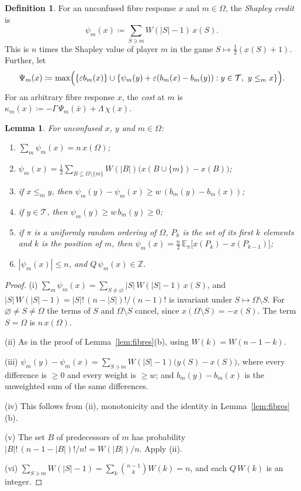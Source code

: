 \documentclass[11pt]{article}
\newcommand{\chg}[1]{{\color{red}#1}}
\newtheorem{lemma}[theorem]{Lemma}
\theoremstyle{definition}
\newtheorem{definition}[theorem]{Definition}
\theoremstyle{remark}
\newcommand{\T}{\mathcal T}
\begin{document}
\begin{definition}\label{def:cost}
For an unconfused fibre response $x$ and $m\in\Omega$, the \emph{Shapley credit} is
\[
\psi_m(x)\coloneqq\sum_{S\ni m}W(|S|-1)\,x(S).
\]
\chg{This is $n$ times the Shapley value \cite{Shapley1953} of player $m$ in the game $S\mapsto\tfrac12(x(S)+1)$.} Further, let
\[
\Psi_m(x)\coloneqq\max\Bigl(\{\varepsilon b_m(x)\}\cup\{\psi_m(y)+\varepsilon(b_m(x)-b_m(y)):y\in\T,\ y\le_mx\}\Bigr).
\]
For an arbitrary fibre response $x$, the \emph{cost} at $m$ is $\kappa_m(x)\coloneqq-\Gamma\,\Psi_m(\bar x)+\Lambda\,\chi(x)$.
\end{definition}

\begin{lemma}\label{lem:SH}
For unconfused $x$, $y$ and $m\in\Omega$:
\begin{enumerate}[label=\textup{(\roman*)}]
\item $\sum_m\psi_m(x)=n\,x(\Omega)$;
\item $\psi_m(x)=\tfrac12\sum_{B\subseteq\Omega\setminus\{m\}}W(|B|)\bigl(x(B\cup\{m\})-x(B)\bigr)$;
\item if $x\le_my$, then $\psi_m(y)-\psi_m(x)\ge w\,(b_m(y)-b_m(x))$;
\item if $y\in\T$, then $\psi_m(y)\ge w\,b_m(y)\ge0$;
\item if $\pi$ is a uniformly random ordering of $\Omega$, $P_k$ is the set of its first $k$ elements and $k$ is the position of $m$, then $\psi_m(x)=\tfrac n2\,\mathbb E_\pi\bigl[x(P_k)-x(P_{k-1})\bigr]$;
\item $|\psi_m(x)|\le n$, and $Q\,\psi_m(x)\in\mathbb Z$.
\end{enumerate}
\end{lemma}
\begin{proof}
(i) $\sum_m\psi_m(x)=\sum_{S\neq\varnothing}|S|\,W(|S|-1)\,x(S)$, and $|S|\,W(|S|-1)=|S|!\,(n-|S|)!/(n-1)!$ is invariant under $S\mapsto\Omega\setminus S$. For $\varnothing\neq S\neq\Omega$ the terms of $S$ and $\Omega\setminus S$ cancel, since $x(\Omega\setminus S)=-x(S)$. The term $S=\Omega$ is $n\,x(\Omega)$.

(ii) As in the proof of Lemma~\ref{lem:fibres}(b), using $W(k)=W(n-1-k)$.

(iii) \chg{$\psi_m(y)-\psi_m(x)=\sum_{S\ni m}W(|S|-1)\bigl(y(S)-x(S)\bigr)$, where every difference is $\ge0$ and every weight is $\ge w$; and $b_m(y)-b_m(x)$ is the unweighted sum of the same differences.}

(iv) This follows from (ii), monotonicity and the identity in Lemma~\ref{lem:fibres}(b).

(v) The set $B$ of predecessors of $m$ has probability $|B|!\,(n-1-|B|)!/n!=W(|B|)/n$. Apply (ii).

(vi) $\sum_{S\ni m}W(|S|-1)=\sum_k\binom{n-1}{k}W(k)=n$, and each $Q\,W(k)$ is an integer.
\end{proof}
\end{document}
